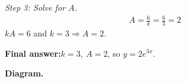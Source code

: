 \documentclass[11pt]{article}
\begin{document}
\textit{Step 3: Solve for \( A \).}
\[\begin{gathered}
A = \frac{6}{k} = \frac{6}{3} = 2
\end{gathered}\]
\( kA = 6 \) and \( k = 3 \Rightarrow A = 2 \).

\begin{answerbox}
\textbf{Final answer:}\quad \(\displaystyle  k = 3,\ A = 2 \), so \(\displaystyle  y = 2e^{3x} \).
\end{answerbox}
\textbf{Diagram.}

\begin{center}
\end{center}
\end{document}
